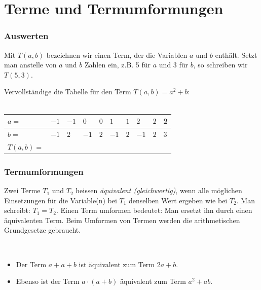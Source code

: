 \chapter{Terme und Termumformungen}

\subsection*{Auswerten}
Mit $T(a,b)$ bezeichnen wir einen Term, der die Variablen $a$ und $b$ enthält. Setzt man anstelle von $a$ und $b$ Zahlen ein, z.B. 5 für $a$ und 3 für $b$, so schreiben wir $T(5,3)$.
\begin{example}
	Vervollständige die Tabelle für den Term $T(a,b) = a^2 + b$:\\~\\
	\bgroup
	\def\arraystretch{1.5}
		\begin{tabularx}{\textwidth}{|X||p{2.5em}|p{2.5em}|p{2.5em}|p{2.5em}|p{2.5em}|p{2.5em}|p{2.5em}|p{2.5em}|p{2.5em}|}\hline
			\centering $a =$ & \centering $-1$ & \centering $-1$ & \centering $0$ & \centering $0$ & \centering $1$ & \centering $1$ & \centering $2$ & \centering $2$ & \hspace{.4cm}2\\\hline
			\centering $b =$ & \centering $-1$ & \centering $2$ & \centering $-1$ & \centering $2$ & \centering $-1$ & \centering $2$ & \centering $-1$ & \centering $2$ & \hspace{.4cm}3\\\hline
			\centering $T(a, b) =$ & \centering 2 & & & & & & & & \\\hline
		\end{tabularx}
	\egroup
\end{example}

\subsection*{Termumformungen}
Zwei Terme $T_1$ und $T_2$ heissen \emph{äquivalent (gleichwertig)}, wenn alle möglichen Einsetzungen für die Variable(n) bei $T_1$ denselben Wert ergeben wie bei $T_2$.
Man schreibt: $T_1 = T_2$.
Einen Term umformen bedeutet:
Man ersetzt ihn durch einen äquivalenten Term.
Beim Umformen von Termen werden die arithmetischen Grundgesetze gebraucht.

\begin{example}~
\begin{itemize}\def\itemsep{0pt}
 \item Der Term $a+a+b$ ist äquivalent zum Term $2a + b$.
 \item Ebenso ist der Term $a\cdot (a + b)$ äquivalent zum Term $a^2 + ab$.
\end{itemize}
\end{example}


